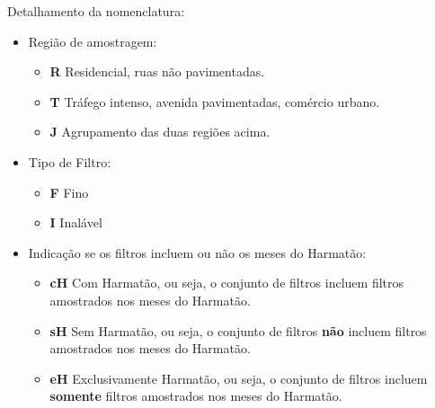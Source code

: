 Detalhamento da nomenclatura: 
\begin{itemize}
\item Região de amostragem: 
	\begin{itemize}
	\item \textbf{R} Residencial, ruas não pavimentadas. 
	\item \textbf{T} Tráfego intenso, avenida pavimentadas, comércio urbano.
	\item \textbf{J} Agrupamento das duas regiões acima.
	\end{itemize}
\item Tipo de Filtro:
	\begin{itemize}
	\item \textbf{F} Fino
	\item \textbf{I} Inalável
	\end{itemize}
\item Indicação se os filtros incluem ou não os meses do Harmatão:
	\begin{itemize}
	\item \textbf{cH} Com Harmatão, ou seja, o conjunto de filtros 
        incluem filtros amostrados nos meses do Harmatão.
	\item \textbf{sH} Sem Harmatão, ou seja, o conjunto de filtros \textbf{não} 
        incluem filtros amostrados nos meses do Harmatão.
	\item \textbf{eH} Exclusivamente Harmatão, ou seja, o conjunto de filtros 
        incluem \textbf{somente} filtros amostrados nos meses do Harmatão.
	\end{itemize}
\end{itemize}

